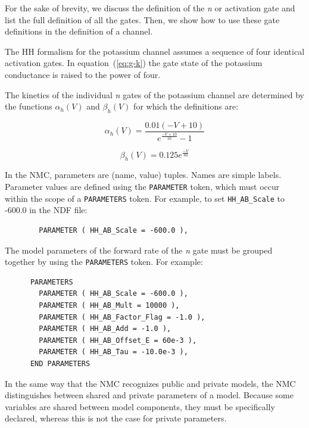 \documentclass[12pt]{article}
\begin{document}
For the sake of brevity, we discuss the definition of the {\it n} or
activation gate and list the full
definition of all the gates.  Then, we show how to use these gate
definitions in the definition of a channel.


The HH formalism for the potassium channel assumes a sequence of four
identical activation gates.  In
equation~(\ref{eq:g-k}) the gate state of the
potassium conductance is raised to the power of four.

The kinetics of the individual {\it n} gates of the potassium channel are
determined by the functions $\alpha_h(V)$ and $\beta_h(V)$ for which
the definitions are:

\begin{equation}
  \label{eq:hh-alpha}
  \alpha_h(V) = \frac{0.01(-V + 10)}{e^{\frac{-V + 10}{10}} -
    1}
\end{equation}

\begin{equation}
  \label{eq:hh-beta}
  \beta_h(V) = 0.125 e^{ \frac{- V}{80} }
\end{equation}

In the NMC, parameters are (name, value) tuples.  Names are simple
labels.  Parameter values are defined using the {\tt PARAMETER} token,
which must occur within the scope of a {\tt PARAMETERS} token. For example, to set {\tt HH\_AB\_Scale}
to -600.0 in the NDF file:

\begin{verbatim}
        PARAMETER ( HH_AB_Scale = -600.0 ),
\end{verbatim}

The model parameters of the forward rate of the {\it n} gate must be
grouped together by using the {\tt PARAMETERS} token.  For example:

\begin{verbatim}
      PARAMETERS
        PARAMETER ( HH_AB_Scale = -600.0 ),
        PARAMETER ( HH_AB_Mult = 10000 ),
        PARAMETER ( HH_AB_Factor_Flag = -1.0 ),
        PARAMETER ( HH_AB_Add = -1.0 ),
        PARAMETER ( HH_AB_Offset_E = 60e-3 ),
        PARAMETER ( HH_AB_Tau = -10.0e-3 ),
      END PARAMETERS
\end{verbatim}

In the same way that the NMC recognizes public and private models, the
NMC distinguishes between shared and private parameters of a model.
Because some variables are shared between model components, they must
be specifically declared, whereas this is not the case for private
parameters.
\end{document}
